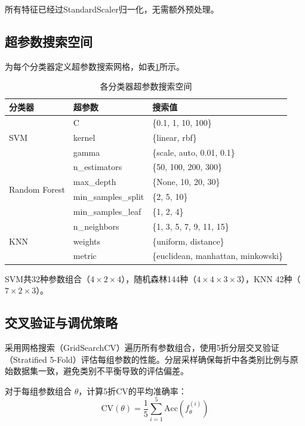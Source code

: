 \documentclass[12pt,a4paper]{ctexart}
\begin{document}
所有特征已经过StandardScaler归一化，无需额外预处理。

\subsection{超参数搜索空间}

为每个分类器定义超参数搜索网格，如表\ref{tab:param_grid}所示。

\begin{table}[H]
\centering
\caption{各分类器超参数搜索空间}
\label{tab:param_grid}
\begin{tabular}{lll}
\toprule
\textbf{分类器} & \textbf{超参数} & \textbf{搜索值} \\
\midrule
\multirow{3}{*}{SVM}
    & C       & \{0.1, 1, 10, 100\} \\
    & kernel  & \{linear, rbf\} \\
    & gamma   & \{scale, auto, 0.01, 0.1\} \\
\midrule
\multirow{4}{*}{Random Forest}
    & n\_estimators     & \{50, 100, 200, 300\} \\
    & max\_depth        & \{None, 10, 20, 30\} \\
    & min\_samples\_split & \{2, 5, 10\} \\
    & min\_samples\_leaf & \{1, 2, 4\} \\
\midrule
\multirow{3}{*}{KNN}
    & n\_neighbors & \{1, 3, 5, 7, 9, 11, 15\} \\
    & weights      & \{uniform, distance\} \\
    & metric       & \{euclidean, manhattan, minkowski\} \\
\bottomrule
\end{tabular}
\end{table}

SVM共32种参数组合（$4\times2\times4$），随机森林144种（$4\times4\times3\times3$），KNN 42种（$7\times2\times3$）。

\subsection{交叉验证与调优策略}

采用网格搜索（GridSearchCV）遍历所有参数组合，使用5折分层交叉验证（Stratified 5-Fold）评估每组参数的性能。分层采样确保每折中各类别比例与原始数据集一致，避免类别不平衡导致的评估偏差。

对于每组参数组合 $\theta$，计算5折CV的平均准确率：
\begin{equation}
    \text{CV}(\theta) = \frac{1}{5} \sum_{i=1}^{5} \text{Acc}\left(f_{\theta}^{(i)}\right)
\end{equation}
\end{document}
